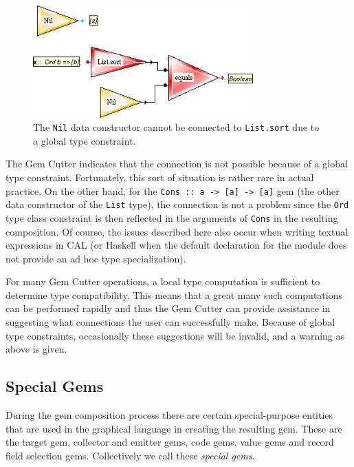 \documentclass[preprint]{sigplanconf}
\begin{document}
\begin{figure}[htb]
  \centering
  \includegraphics[width=20pc]{globalTypeConstraints.png}
  \caption{The {\tt Nil} data constructor cannot be connected to {\tt List.sort} due to a global type constraint.}
  \label{fig:globalTypeConstraints}
\end{figure}

The Gem Cutter indicates that the connection is not possible because
of a global type constraint. Fortunately, this sort of situation is
rather rare in actual practice.  On the other hand, for the {\tt Cons
:: a -> [a] -> [a]} gem (the other data constructor of the {\tt List}
type), the connection is not a problem since the {\tt Ord} type class
constraint is then reflected in the arguments of {\tt Cons} in the
resulting composition. Of course, the issues described here also occur
when writing textual expressions in CAL (or Haskell when the default
declaration for the module does not provide an ad hoc type specialization).

For many Gem Cutter operations, a local type computation is sufficient
to determine type compatibility. This means that a great many such
computations can be performed rapidly and thus the Gem Cutter can
provide assistance in suggesting what connections the user can
successfully make. Because of global type constraints, occasionally
these suggestions will be invalid, and a warning as above is given.

\subsection{Special Gems}
\label{sec:specialGems}

During the gem composition process there are certain special-purpose
entities that are used in the graphical language in creating the
resulting gem. These are the target gem, collector and emitter gems,
code gems, value gems and record field selection gems. Collectively we
call these {\it special gems}.
\end{document}
